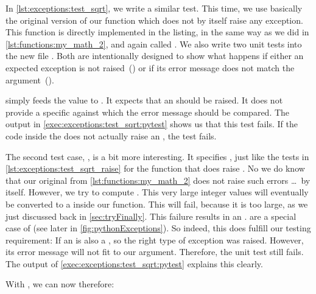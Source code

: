 %
In \cref{lst:exceptions:test_sqrt}, we write a similar test.
This time, we use basically the original version of our  function which does not by itself raise any exception.
This function is directly implemented in the listing, in the same way as we did in \cref{lst:functions:my_math_2}, and again called .
We also write two unit tests into the new file .
Both are intentionally designed to show what happens if either an expected exception is not raised~() or if its error message does not match the  argument~().%
%
\begin{sloppypar}%
 simply feeds the value  to .
It expects that an  should be raised.
It does not provide a specific   against which the error message should be compared.
The output in \cref{exec:exceptions:test_sqrt:pytest} shows us that this test fails.
If the code inside the  does not actually raise an , the test fails.%
\end{sloppypar}%
%
\begin{sloppypar}%
The second test case, , is a bit more interesting.
It specifies , just like the tests in \cref{lst:exceptions:test_sqrt_raise} for the  function that does raise .
No we do know that our original  from \cref{lst:functions:my_math_2} does not raise such errors \dots\ by itself.
However, we try to compute .
This very large integer values will eventually be converted to a  inside our function.
This will fail, because it is too large, as we just discussed back in \cref{sec:tryFinally}.
This failure results in an .
 are a special case of  (see later in \cref{fig:pythonExceptions}).
So indeed, this does fulfill our testing requirement:
If an  is also a , so the right type of exception was raised.
However, its error message will not fit to our  argument.
Therefore, the unit test still fails.
The output of \cref{exec:exceptions:test_sqrt:pytest} explains this clearly.%
\end{sloppypar}%
%
With \pytest, we can now therefore:%
